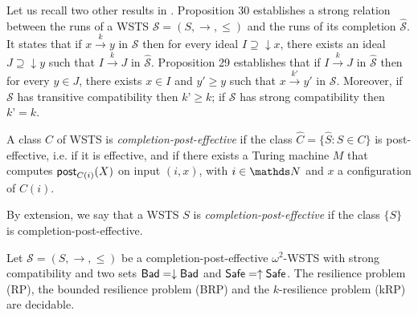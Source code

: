 Let us recall two other results in \cite{BFM-ic17}. Proposition 30 establishes a strong relation between the runs of a WSTS $\mathscr{S}=(S,\rightarrow, \leq)$ and the runs of its completion $\hat{\mathscr{S}}$. It states that if $x \xrightarrow{k} y$ in $\mathscr{S}$ then for every ideal $I \supseteq \downarrow x$, there exists an ideal $J \supseteq \downarrow y$ such that $I \xrightarrow{k} J$ in $\hat{\mathscr{S}}$. Proposition 29 establishes that if $I \xrightarrow{k} J$ in $\hat{\mathscr{S}}$ then for every $y \in J$, there exists $x \in I$ and $y' \geq y$ such that $x \xrightarrow{k'} y'$ in $\mathscr{S}$. Moreover, if $\mathscr{S}$ has transitive compatibility then $k’ \geq k$; if $\mathscr{S}$ has strong compatibility then $k’ = k$.
%

\begin{definition}
A class $C$ of WSTS is {\em completion-post-effective} if
the class $\hat{C} = \{ \hat{S} : S \in C\}$ is post-effective, i.e. if it is effective,
and 
if there exists a Turing machine $M$ that computes $\textsf{post}_{C(i)}(X)$ on input $(i,x)$, with $i \in \N$ and $x$ a configuration of $C(i)$.
\end{definition}

By extension, we say that a WSTS $S$ is {\em completion-post-effective} if the 
class $\{S\}$ is completion-post-effective.


%
\begin{theorem}\label{down-up}
Let $\mathscr{S}=(S,\rightarrow, \leq)$ be a completion-post-effective $\omega^2$-WSTS with strong compatibility and two 
 sets $\textsf{Bad} = \downarrow \textsf{Bad}$ and $\textsf{Safe} = \uparrow \textsf{Safe}$.
The resilience problem (RP), the bounded resilience problem (BRP)
and the $k$-resilience problem (kRP) are decidable.
\end{theorem}

